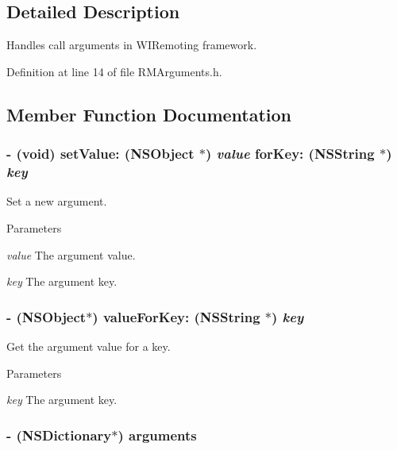 \subsection{Detailed Description}
Handles call arguments in WIRemoting framework. 

Definition at line 14 of file RMArguments.h.

\subsection{Member Function Documentation}
\hypertarget{interface_r_m_arguments_a1e85072f47879b66ba598dabf2bbcf69}{
\subsubsection[{setValue:forKey:}]{\setlength{\rightskip}{0pt plus 5cm}-\/ (void) setValue: (NSObject $\ast$) {\em value}\/ forKey: (NSString $\ast$) {\em key}}}
\label{interface_r_m_arguments_a1e85072f47879b66ba598dabf2bbcf69}


Set a new argument. 
\begin{DoxyParams}{Parameters}
\item[{\em value}]The argument value. \item[{\em key}]The argument key. \end{DoxyParams}
\hypertarget{interface_r_m_arguments_a7a9997955aea7ea469e7c94683b777e0}{
\subsubsection[{valueForKey:}]{\setlength{\rightskip}{0pt plus 5cm}-\/ (NSObject$\ast$) valueForKey: (NSString $\ast$) {\em key}}}
\label{interface_r_m_arguments_a7a9997955aea7ea469e7c94683b777e0}


Get the argument value for a key. 
\begin{DoxyParams}{Parameters}
\item[{\em key}]The argument key. \end{DoxyParams}
\hypertarget{interface_r_m_arguments_a840dc27fd0f6266b79451b530b5a7f42}{
\subsubsection[{arguments}]{\setlength{\rightskip}{0pt plus 5cm}-\/ (NSDictionary$\ast$) arguments }}
\label{interface_r_m_arguments_a840dc27fd0f6266b79451b530b5a7f42}


